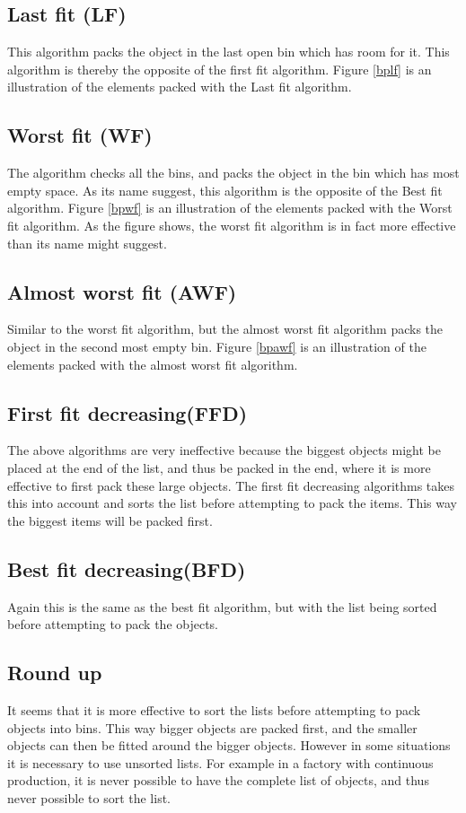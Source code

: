 \subsection{Last fit (LF)}
This algorithm packs the object in the last open bin which has room for it. This algorithm is thereby the opposite of the first fit algorithm. Figure \ref{bplf} is an illustration of the elements packed with the Last fit algorithm.


\subsection{Worst fit (WF)}
The algorithm checks all the bins, and packs the object in the bin which has most empty space. As its name suggest, this algorithm is the opposite of the Best fit algorithm. Figure \ref{bpwf} is an illustration of the elements packed with the Worst fit algorithm. As the figure shows, the worst fit algorithm is in fact more effective than its name might suggest. 

\subsection{Almost worst fit (AWF)}
Similar to the worst fit algorithm, but the almost worst fit algorithm packs the object in the second most empty bin.  Figure \ref{bpawf} is an illustration of the elements packed with the almost worst fit algorithm.

\subsection{First fit decreasing(FFD)}
The above algorithms are very ineffective because the biggest objects might be placed at the end of the list, and thus be packed in the end, where it is more effective to first pack these large objects.
The first fit decreasing algorithms takes this into account and sorts the list before attempting to pack the items. This way the biggest items will be packed first.

\subsection{Best fit decreasing(BFD)}
Again this is the same as the best fit algorithm, but with the list being sorted before attempting to pack the objects.

\subsection{Round up}
It seems that it is more effective to sort the lists before attempting to pack objects into bins. This way bigger objects are packed first, and the smaller objects can then be fitted around the bigger objects. However in some situations it is necessary to use unsorted lists. For example in a factory with continuous production, it is never possible to have the complete list of objects, and thus never possible to sort the list.